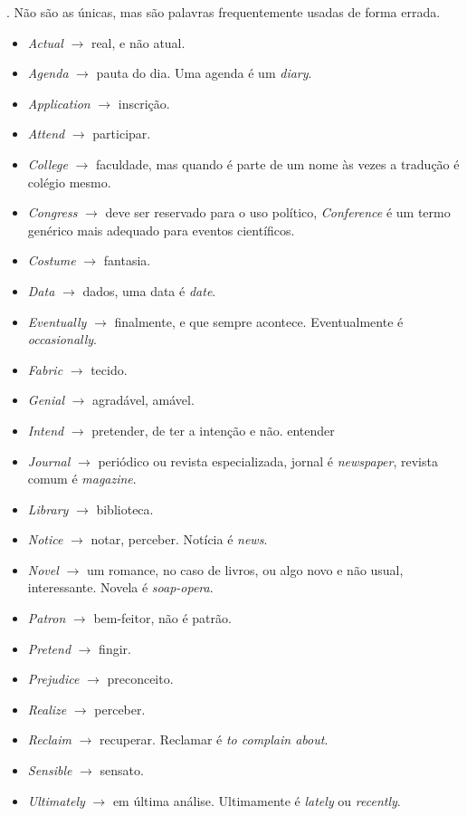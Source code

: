 \documentclass[openany]{book}
\begin{document}
. Não são as únicas, mas são palavras frequentemente usadas de forma errada.
\begin{itemize}
    \item \textit{Actual} $\rightarrow$ real, e não atual.
    \item \textit{Agenda} $\rightarrow$ pauta do dia. Uma agenda é um \textit{diary}.
    \item \textit{Application} $\rightarrow$ inscrição.
    \item \textit{Attend} $\rightarrow$ participar.
    \item \textit{College} $\rightarrow$ faculdade, mas quando é parte de um nome às vezes a tradução é colégio mesmo.
    \item \textit{Congress} $\rightarrow$ deve ser reservado para o uso político, \textit{Conference} é um termo genérico mais adequado para eventos científicos.
    \item \textit{Costume} $\rightarrow$ fantasia.
    \item \textit{Data} $\rightarrow$ dados, uma data é \textit{date}.
    \item \textit{Eventually} $\rightarrow$ finalmente, e que sempre acontece. Eventualmente é \textit{occasionally}.
    \item \textit{Fabric} $\rightarrow$ tecido.
    \item \textit{Genial} $\rightarrow$ agradável, amável.
    \item \textit{Intend} $\rightarrow$ pretender, de ter a intenção e não. entender
    \item \textit{Journal} $\rightarrow$ periódico ou revista especializada, jornal é \textit{newspaper}, revista comum é \textit{magazine}.
    \item \textit{Library} $\rightarrow$ biblioteca.
    \item \textit{Notice} $\rightarrow$ notar, perceber. Notícia é \textit{news}.
    \item \textit{Novel} $\rightarrow$ um romance, no caso de livros, ou algo novo e não usual, interessante. Novela é \textit{soap-opera}.
    \item \textit{Patron} $\rightarrow$ bem-feitor, não é patrão.
    \item \textit{Pretend} $\rightarrow$ fingir.
    \item \textit{Prejudice} $\rightarrow$ preconceito.
    \item \textit{Realize} $\rightarrow$ perceber.
    \item \textit{Reclaim} $\rightarrow$ recuperar. Reclamar é \textit{to complain about}.
    \item \textit{Sensible} $\rightarrow$ sensato.
    \item \textit{Ultimately} $\rightarrow$ em última análise. Ultimamente é \textit{lately} ou \textit{recently}.
    \end{itemize}
\end{document}
